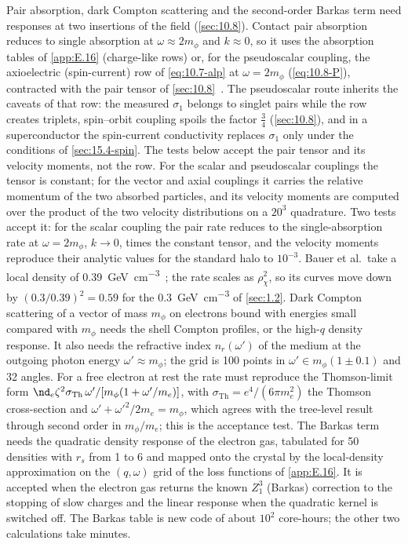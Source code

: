 Pair absorption, dark Compton scattering and the second-order Barkas term need responses at two insertions of the field (\cref{sec:10.8}). Contact pair absorption reduces to single absorption at $\omega \approx 2m_\phi$ and $k \approx 0$, so it uses the absorption tables of \cref{app:E.16} (charge-like rows) or, for the pseudoscalar coupling, the axioelectric (spin-current) row of \cref{eq:10.7-alp} at $\omega = 2m_\phi$ (\cref{eq:10.8-P}), contracted with the pair tensor of \cref{sec:10.8}~\cite[Eqs.~(5)--(8)]{bauer2026dark}. The pseudoscalar route inherits the caveats of that row: the measured $\sigma_1$ belongs to singlet pairs while the row creates triplets, spin--orbit coupling spoils the factor $\frac34$ (\cref{sec:10.8}), and in a superconductor the spin-current conductivity replaces $\sigma_1$ only under the conditions of \cref{sec:15.4-spin}. The tests below accept the pair tensor and its velocity moments, not the row. For the scalar and pseudoscalar couplings the tensor is constant; for the vector and axial couplings it carries the relative momentum of the two absorbed particles, and its velocity moments are computed over the product of the two velocity distributions on a $20^3$ quadrature. Two tests accept it: for the scalar coupling the pair rate reduces to the single-absorption rate at $\omega = 2m_\phi$, $k \to 0$, times the constant tensor, and the velocity moments reproduce their analytic values for the standard halo to $10^{-3}$. Bauer et al.\ take a local density of \SI{0.39}{GeV.cm^{-3}}~\cite{bauer2026dark}; the rate scales as $\rho_\chi^2$, so its curves move down by $(0.3/0.39)^2 = 0.59$ for the \SI{0.3}{GeV.cm^{-3}} of \cref{sec:1.2}. Dark Compton scattering of a vector of mass $m_\phi$ on electrons bound with energies small compared with $m_\phi$ needs the shell Compton profiles, or the high-$q$ density response. It also needs the refractive index $n_r(\omega')$ of the medium at the outgoing photon energy $\omega' \approx m_\phi$; the grid is 100 points in $\omega' \in m_\phi(1 \pm 0.1)$ and 32 angles. For a free electron at rest the rate must reproduce the Thomson-limit form $\nd_e\zeta^2\sigma_{\mathrm{Th}}\,\omega'/[m_\phi(1 + \omega'/m_e)]$, with $\sigma_{\mathrm{Th}} = e^4/(6\pi m_e^2)$ the Thomson cross-section and $\omega' + \omega'^2/2m_e = m_\phi$, which agrees with the tree-level result~\cite[Eq.~(2)]{hochberg2022impact} through second order in $m_\phi/m_e$; this is the acceptance test. The Barkas term needs the quadratic density response of the electron gas, tabulated for 50 densities with $r_s$ from 1 to 6 and mapped onto the crystal by the local-density approximation on the $(q,\omega)$ grid of the loss functions of \cref{app:E.16}. It is accepted when the electron gas returns the known $Z_1^3$ (Barkas) correction to the stopping of slow charges and the linear response when the quadratic kernel is switched off. The Barkas table is new code of about $10^2$ core-hours; the other two calculations take minutes.
